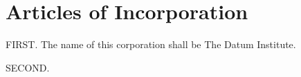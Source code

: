 \section{Articles of Incorporation}

FIRST. The name of this corporation shall be The Datum Institute.

SECOND. 

